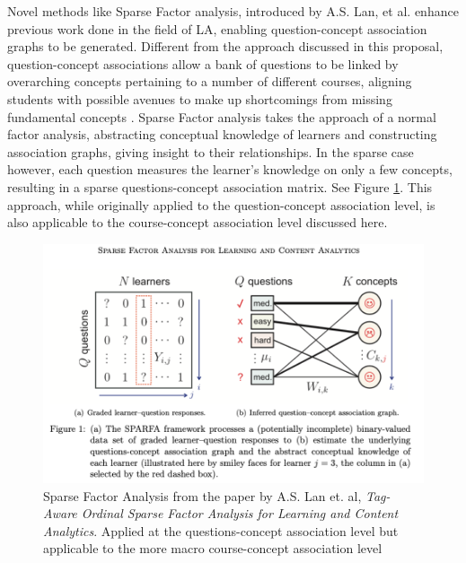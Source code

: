 \indent Novel methods like Sparse Factor analysis, introduced by A.S. Lan, et al. enhance previous work done in the field of LA, enabling question-concept association graphs to be generated. Different from the approach discussed in this proposal, question-concept associations allow a bank of questions to be linked by overarching concepts pertaining to a number of different courses, aligning students with possible avenues to make up shortcomings from missing fundamental concepts \cite{lan_sparse_nodate}\cite{willcox_network_2017}. Sparse Factor analysis takes the approach of a normal factor analysis, abstracting conceptual knowledge of learners and constructing association graphs, giving insight to their relationships. In the sparse case however, each question measures the learner’s knowledge on only a few concepts, resulting in a sparse questions-concept association matrix.  See Figure \ref{fig:sparfa}. This approach, while originally applied to the question-concept association level, is also applicable to the course-concept association level discussed here. 




\begin{figure}[ht]
\centering

\includegraphics[width = \textwidth]{../images/sparfa.png}
\caption{Sparse Factor Analysis from the paper by A.S. Lan et. al, \textit{Tag-Aware Ordinal Sparse Factor Analysis for Learning and Content Analytics}. Applied at the questions-concept association level but applicable to the more macro course-concept association level}
\label{fig:sparfa}
\end{figure}










